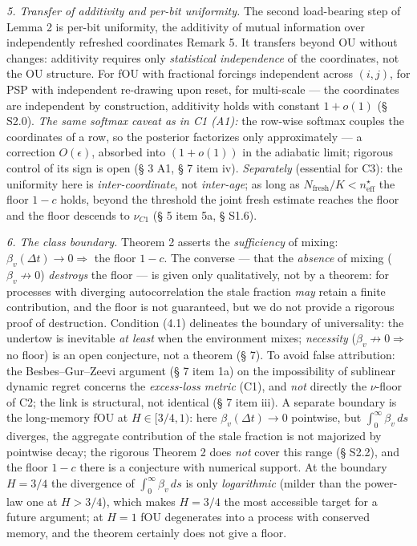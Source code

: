 \documentclass[12pt]{iopart}
\begin{document}
\emph{5. Transfer of additivity and per-bit uniformity.} The second load-bearing step of Lemma 2 is per-bit uniformity, the additivity of mutual information over independently refreshed coordinates \cite{Andriishin2026b} Remark 5. It transfers beyond OU without changes: additivity requires only \emph{statistical independence} of the coordinates, not the OU structure. For fOU with fractional forcings independent across \((i,j)\), for PSP with independent re-drawing upon reset, for multi-scale --- the coordinates are independent by construction, additivity holds with constant \(1 + o(1)\) (§ S2.0). \emph{The same softmax caveat as in C1 (A1):} the row-wise softmax couples the coordinates of a row, so the posterior factorizes only approximately --- a correction \(O(\epsilon)\), absorbed into \((1+o(1))\) in the adiabatic limit; rigorous control of its sign is open (§ 3 A1, § 7 item iv). \emph{Separately} (essential for C3): the uniformity here is \emph{inter-coordinate}, not \emph{inter-age}; as long as \(N_{\text{fresh}}/K < n_{\text{eff}}^\star\) the floor \(1-c\) holds, beyond the threshold the joint fresh estimate reaches the floor and the floor descends to \(\nu_{C1}\) (§ 5 item 5a, § S1.6).



\emph{6. The class boundary.} Theorem 2 asserts the \emph{sufficiency} of mixing: \(\beta_v(\Delta t)\to 0 \Rightarrow\) the floor \(1-c\). The converse --- that the \emph{absence} of mixing (\(\beta_v\not\to 0\)) \emph{destroys} the floor --- is given only qualitatively, not by a theorem: for processes with diverging autocorrelation the stale fraction \emph{may} retain a finite contribution, and the floor is not guaranteed, but we do not provide a rigorous proof of destruction. Condition (4.1) delineates the boundary of universality: the undertow is inevitable \emph{at least} when the environment mixes; \emph{necessity} (\(\beta_v\not\to0 \Rightarrow\) no floor) is an open conjecture, not a theorem (§ 7). To avoid false attribution: the Besbes--Gur--Zeevi argument (§ 7 item 1a) on the impossibility of sublinear dynamic regret concerns the \emph{excess-loss metric} (C1), and \emph{not} directly the \(\nu\)-floor of C2; the link is structural, not identical (§ 7 item iii). A separate boundary is the long-memory fOU at \(H \in [3/4, 1)\): here \(\beta_v(\Delta t) \to 0\) pointwise, but \(\int_0^\infty\beta_v\,ds\) diverges, the aggregate contribution of the stale fraction is not majorized by pointwise decay; the rigorous Theorem 2 does \emph{not} cover this range (§ S2.2), and the floor \(1-c\) there is a conjecture with numerical support. At the boundary \(H = 3/4\) the divergence of \(\int_0^\infty\beta_v\,ds\) is only \emph{logarithmic} (milder than the power-law one at \(H > 3/4\)), which makes \(H = 3/4\) the most accessible target for a future argument; at \(H = 1\) fOU degenerates into a process with conserved memory, and the theorem certainly does not give a floor.
\end{document}
